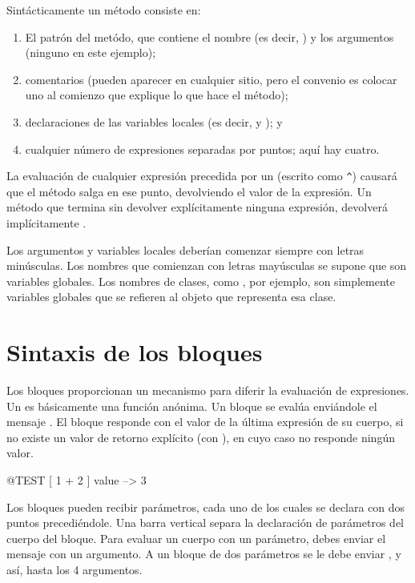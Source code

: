 \documentclass[a4paper,10pt,twoside]{book}
\begin{document}
Sint\'acticamente un m\'etodo consiste en:
\begin{enumerate}
  \item El patr\'on del met\'odo, que contiene el nombre (es decir, ) y los argumentos (ninguno en este ejemplo);
  \item comentarios (pueden aparecer en cualquier sitio, pero el convenio es colocar uno al comienzo que explique lo que hace el m\'etodo);
  \item declaraciones de las variables locales (es decir,  y ); y
  \item cualquier n\'umero de expresiones separadas por puntos; aqu\'i hay cuatro.
\end{enumerate}

La evaluaci\'on de cualquier expresi\'on precedida por un \ct{^} (escrito como \verb|^|) causar\'a que el m\'etodo salga en ese punto, devolviendo el valor de la expresi\'on.
Un m\'etodo que termina sin devolver expl\'icitamente ninguna expresi\'on, devolver\'a impl\'icitamente .

Los argumentos y variables locales deber\'ian comenzar siempre con letras min\'usculas.
Los nombres que comienzan con letras may\'usculas se supone que son variables globales.
Los nombres de clases, como , por ejemplo, son simplemente variables globales que se refieren al objeto que representa esa clase.


\section{Sintaxis de los bloques}

Los bloques proporcionan un mecanismo para diferir la evaluaci\'on de expresiones.
Un  es b\'asicamente una funci\'on an\'onima. Un bloque se eval\'ua envi\'andole el mensaje .
El bloque responde con el valor de la \'ultima expresi\'on de su cuerpo, si no existe un valor de retorno expl\'icito (con \ct{^}), en cuyo caso no responde ning\'un valor.

\begin{code}{@TEST}
[ 1 + 2 ] value --> 3
\end{code}

Los bloques pueden recibir par\'ametros, cada uno de los cuales se declara con dos puntos precedi\'endole. Una barra vertical separa la declaraci\'on de par\'ametros del cuerpo del bloque. Para evaluar un cuerpo con un par\'ametro, debes enviar el mensaje  con un argumento. A un bloque de dos par\'ametros se le debe enviar , y as\'i, hasta los 4 argumentos.
\end{document}
